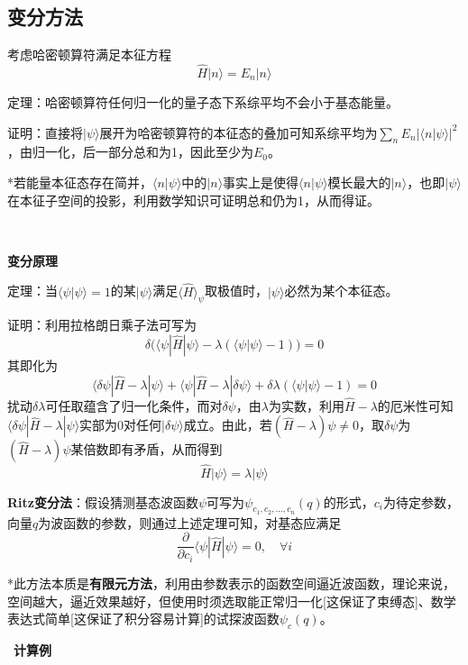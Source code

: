 \documentclass[a4paper,UTF8,fontset=windows]{ctexart}
\newcommand*{\ket}[1]{|#1\rangle}
\newcommand*{\bk}[2]{\langle#1|#2\rangle}
\newcommand*{\blk}[3]{\langle#1|#2|#3\rangle}
\begin{document}
\subsection{变分方法}
考虑哈密顿算符满足本征方程
$$\hat{H}\ket{n}=E_n\ket{n}$$

定理：哈密顿算符任何归一化的量子态下系综平均不会小于基态能量。

证明：直接将$\ket{\psi}$展开为哈密顿算符的本征态的叠加可知系综平均为$\sum_nE_n|\bk{n}{\psi}|^2$，由归一化，后一部分总和为1，因此至少为$E_0$。

*若能量本征态存在简并，$\bk{n}{\psi}$中的$\ket{n}$事实上是使得$\bk{n}{\psi}$模长最大的$\ket{n}$，也即$\ket{\psi}$在本征子空间的投影，利用数学知识可证明总和仍为1，从而得证。

\

\textbf{变分原理}

定理：当$\bk{\psi}{\psi}=1$的某$\ket{\psi}$满足$\langle \hat{H}\rangle_\psi$取极值时，$\ket{\psi}$必然为某个本征态。

证明：利用拉格朗日乘子法可写为
$$\delta\big(\blk{\psi}{\hat{H}}{\psi}-\lambda(\bk{\psi}{\psi}-1)\big)=0$$
其即化为
$$\blk{\delta\psi}{\hat{H}-\lambda}{\psi}+\blk{\psi}{\hat{H}-\lambda}{\delta\psi}+\delta\lambda(\bk{\psi}{\psi}-1)=0$$
扰动$\delta\lambda$可任取蕴含了归一化条件，而对$\delta\psi$，由$\lambda$为实数，利用$\hat{H}-\lambda$的厄米性可知$\blk{\delta\psi}{\hat{H}-\lambda}{\psi}$实部为0对任何$\ket{\delta\psi}$成立。由此，若$(\hat{H}-\lambda)\psi\ne0$，取$\delta\psi$为$(\hat{H}-\lambda)\psi$某倍数即有矛盾，从而得到
$$\hat{H}\ket{\psi}=\lambda\ket{\psi}$$

\textbf{Ritz变分法}：假设猜测基态波函数$\psi$可写为$\psi_{c_1,c_2,\dots,c_n}(q)$的形式，$c_i$为待定参数，向量$q$为波函数的参数，则通过上述定理可知，对基态应满足
$$\frac{\partial}{\partial c_i}\blk{\psi}{\hat{H}}{\psi}=0,\quad\forall i$$

*此方法本质是\textbf{有限元方法}，利用由参数表示的函数空间逼近波函数，理论来说，空间越大，逼近效果越好，但使用时须选取能正常归一化[这保证了束缚态]、数学表达式简单[这保证了积分容易计算]的试探波函数$\psi_c(q)$。

\
\textbf{计算例}
\end{document}
